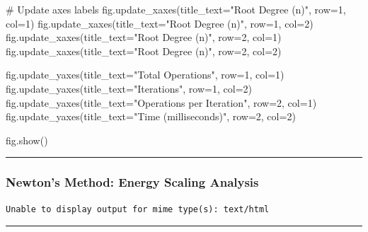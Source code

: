 \documentclass[
  letterpaper,
  DIV=11,
  numbers=noendperiod]{scrartcl}
\newenvironment{Shaded}{\begin{snugshade}}{\end{snugshade}}
\newcommand{\CommentTok}[1]{\textcolor[rgb]{0.37,0.37,0.37}{#1}}
\newcommand{\DecValTok}[1]{\textcolor[rgb]{0.68,0.00,0.00}{#1}}
\newcommand{\NormalTok}[1]{\textcolor[rgb]{0.00,0.23,0.31}{#1}}
\newcommand{\OperatorTok}[1]{\textcolor[rgb]{0.37,0.37,0.37}{#1}}
\newcommand{\StringTok}[1]{\textcolor[rgb]{0.13,0.47,0.30}{#1}}
\begin{document}
\begin{Shaded}
\begin{Highlighting}[]
\CommentTok{\# Update axes labels}
\NormalTok{fig.update\_xaxes(title\_text}\OperatorTok{=}\StringTok{"Root Degree (n)"}\NormalTok{, row}\OperatorTok{=}\DecValTok{1}\NormalTok{, col}\OperatorTok{=}\DecValTok{1}\NormalTok{)}
\NormalTok{fig.update\_xaxes(title\_text}\OperatorTok{=}\StringTok{"Root Degree (n)"}\NormalTok{, row}\OperatorTok{=}\DecValTok{1}\NormalTok{, col}\OperatorTok{=}\DecValTok{2}\NormalTok{)}
\NormalTok{fig.update\_xaxes(title\_text}\OperatorTok{=}\StringTok{"Root Degree (n)"}\NormalTok{, row}\OperatorTok{=}\DecValTok{2}\NormalTok{, col}\OperatorTok{=}\DecValTok{1}\NormalTok{)}
\NormalTok{fig.update\_xaxes(title\_text}\OperatorTok{=}\StringTok{"Root Degree (n)"}\NormalTok{, row}\OperatorTok{=}\DecValTok{2}\NormalTok{, col}\OperatorTok{=}\DecValTok{2}\NormalTok{)}

\NormalTok{fig.update\_yaxes(title\_text}\OperatorTok{=}\StringTok{"Total Operations"}\NormalTok{, row}\OperatorTok{=}\DecValTok{1}\NormalTok{, col}\OperatorTok{=}\DecValTok{1}\NormalTok{)}
\NormalTok{fig.update\_yaxes(title\_text}\OperatorTok{=}\StringTok{"Iterations"}\NormalTok{, row}\OperatorTok{=}\DecValTok{1}\NormalTok{, col}\OperatorTok{=}\DecValTok{2}\NormalTok{)}
\NormalTok{fig.update\_yaxes(title\_text}\OperatorTok{=}\StringTok{"Operations per Iteration"}\NormalTok{, row}\OperatorTok{=}\DecValTok{2}\NormalTok{, col}\OperatorTok{=}\DecValTok{1}\NormalTok{)}
\NormalTok{fig.update\_yaxes(title\_text}\OperatorTok{=}\StringTok{"Time (milliseconds)"}\NormalTok{, row}\OperatorTok{=}\DecValTok{2}\NormalTok{, col}\OperatorTok{=}\DecValTok{2}\NormalTok{)}

\NormalTok{fig.show()}
\end{Highlighting}
\end{Shaded}

\begin{center}\rule{0.5\linewidth}{0.5pt}\end{center}

\subsubsection{Newton's Method: Energy Scaling
Analysis}\label{newtons-method-energy-scaling-analysis}

\begin{verbatim}
Unable to display output for mime type(s): text/html
\end{verbatim}

\begin{center}\rule{0.5\linewidth}{0.5pt}\end{center}
\end{document}
